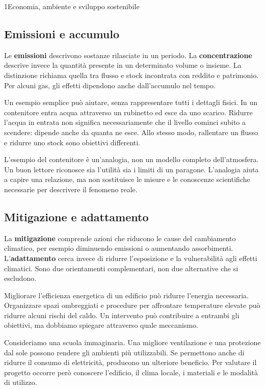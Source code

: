 \begin{lettura}{1}{Economia, ambiente e sviluppo sostenibile}
\subsection*{Emissioni e accumulo}
Le \textbf{emissioni} descrivono sostanze rilasciate in un periodo. La \textbf{concentrazione} descrive invece la quantità presente in un determinato volume o insieme. La distinzione richiama quella tra flusso e stock incontrata con reddito e patrimonio. Per alcuni gas, gli effetti dipendono anche dall'accumulo nel tempo.

Un esempio semplice può aiutare, senza rappresentare tutti i dettagli fisici. In un contenitore entra acqua attraverso un rubinetto ed esce da uno scarico. Ridurre l'acqua in entrata non significa necessariamente che il livello cominci subito a scendere: dipende anche da quanta ne esce. Allo stesso modo, rallentare un flusso e ridurre uno stock sono obiettivi differenti.

L'esempio del contenitore è un'analogia, non un modello completo dell'atmosfera. Un buon lettore riconosce sia l'utilità sia i limiti di un paragone. L'analogia aiuta a capire una relazione, ma non sostituisce le misure e le conoscenze scientifiche necessarie per descrivere il fenomeno reale.

\subsection*{Mitigazione e adattamento}
La \textbf{mitigazione} comprende azioni che riducono le cause del cambiamento climatico, per esempio diminuendo emissioni o aumentando assorbimenti. L'\textbf{adattamento} cerca invece di ridurre l'esposizione e la vulnerabilità agli effetti climatici. Sono due orientamenti complementari, non due alternative che si escludono.

Migliorare l'efficienza energetica di un edificio può ridurre l'energia necessaria. Organizzare spazi ombreggiati e procedure per affrontare temperature elevate può ridurre alcuni rischi del caldo. Un intervento può contribuire a entrambi gli obiettivi, ma dobbiamo spiegare attraverso quale meccanismo.

Consideriamo una scuola immaginaria. Una migliore ventilazione e una protezione dal sole possono rendere gli ambienti più utilizzabili. Se permettono anche di ridurre il consumo di elettricità, producono un ulteriore beneficio. Per valutare il progetto occorre però conoscere l'edificio, il clima locale, i materiali e le modalità di utilizzo.


\end{lettura}
